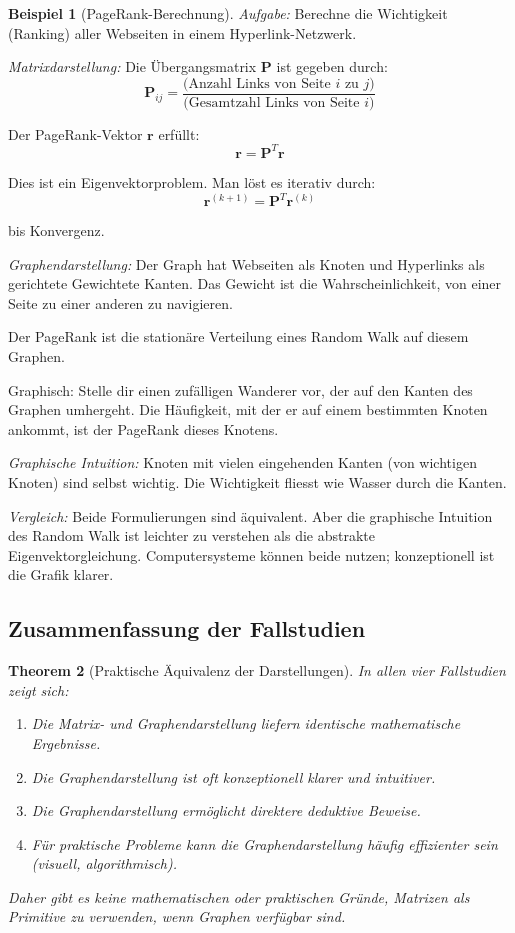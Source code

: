 \documentclass[12pt, a4paper]{article}
\newtheorem{theorem}{Theorem}[section]
\theoremstyle{definition}
\newtheorem{example}[theorem]{Beispiel}
\theoremstyle{remark}
\newcommand{\vP}{\bm{P}}
\begin{document}
\begin{example}[PageRank-Berechnung]
\label{ex:pagerank}
\emph{Aufgabe:} Berechne die Wichtigkeit (Ranking) aller Webseiten in einem Hyperlink-Netzwerk.

\emph{Matrixdarstellung:}
Die Übergangsmatrix $\vP$ ist gegeben durch:
\[
\vP_{ij} = \frac{\text{(Anzahl Links von Seite } i \text{ zu } j \text{)}}{\text{(Gesamtzahl Links von Seite } i \text{)}}
\]

Der PageRank-Vektor $\mathbf{r}$ erfüllt:
\[
\mathbf{r} = \vP^T \mathbf{r}
\]

Dies ist ein Eigenvektorproblem. Man löst es iterativ durch:
\[
\mathbf{r}^{(k+1)} = \vP^T \mathbf{r}^{(k)}
\]

bis Konvergenz.

\emph{Graphendarstellung:}
Der Graph hat Webseiten als Knoten und Hyperlinks als gerichtete Gewichtete Kanten. Das Gewicht ist die Wahrscheinlichkeit, von einer Seite zu einer anderen zu navigieren.

Der PageRank ist die stationäre Verteilung eines Random Walk auf diesem Graphen.

Graphisch: Stelle dir einen zufälligen Wanderer vor, der auf den Kanten des Graphen umhergeht. Die Häufigkeit, mit der er auf einem bestimmten Knoten ankommt, ist der PageRank dieses Knotens.

\emph{Graphische Intuition:}
Knoten mit vielen eingehenden Kanten (von wichtigen Knoten) sind selbst wichtig. Die Wichtigkeit fliesst wie Wasser durch die Kanten.

\emph{Vergleich:}
Beide Formulierungen sind äquivalent. Aber die graphische Intuition des Random Walk ist leichter zu verstehen als die abstrakte Eigenvektorgleichung. Computersysteme können beide nutzen; konzeptionell ist die Grafik klarer.
\end{example}

\subsection{Zusammenfassung der Fallstudien}
\label{subsec:fallstudien_zusammenfassung}

\begin{theorem}[Praktische Äquivalenz der Darstellungen]
\label{thm:praktische_aequivalenz}
In allen vier Fallstudien zeigt sich:
\begin{enumerate}[label=(\alph*)]
  \item Die Matrix- und Graphendarstellung liefern \emph{identische mathematische Ergebnisse}.
  \item Die Graphendarstellung ist oft konzeptionell klarer und intuitiver.
  \item Die Graphendarstellung ermöglicht direktere deduktive Beweise.
  \item Für praktische Probleme kann die Graphendarstellung häufig effizienter sein (visuell, algorithmisch).
\end{enumerate}

Daher gibt es keine mathematischen oder praktischen Gründe, Matrizen als Primitive zu verwenden, wenn Graphen verfügbar sind.
\end{theorem}
\end{document}
